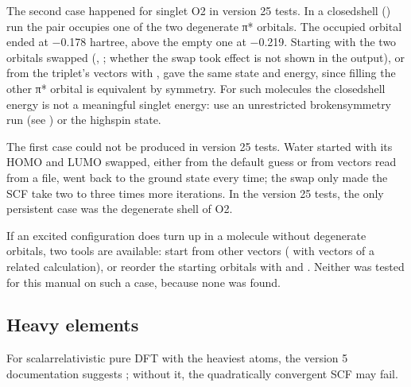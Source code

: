 \documentclass[letterpaper,10pt,english,openany,oneside]{sphinxmanual}
\begin{document}
\sphinxAtStartPar
The second case happened for singlet O2 in version 25 tests. In a closed\sphinxhyphen{}shell () run the pair occupies one
of the two degenerate π* orbitals. The occupied orbital ended at −0.178 hartree, above the empty one at −0.219.
Starting with the two orbitals swapped ({\hyperref[\detokenize{reference/guess:guess-na}]{}}, {\hyperref[\detokenize{reference/guess:guess-nb}]{}}; whether the swap took effect is
not shown in the output), or from the triplet’s vectors with , gave the same state and energy, since filling the other π* orbital is equivalent by symmetry. For such
molecules the closed\sphinxhyphen{}shell energy is not a meaningful singlet energy: use an unrestricted broken\sphinxhyphen{}symmetry run (see
{\hyperref[\detokenize{troubleshooting/common-problems:troubleshooting-open-shell-singlet}]{}}) or the high\sphinxhyphen{}spin state.



\sphinxAtStartPar
The first case could not be produced in version 25 tests. Water started with its HOMO and LUMO swapped, either from
the default guess or from vectors read from a file, went back to the ground state every time; the swap only made
the SCF take two to three times more iterations. In the version 25 tests, the only persistent case was the
degenerate shell of O2.



\sphinxAtStartPar
If an excited configuration does turn up in a molecule without degenerate orbitals, two tools are available: start
from other vectors ( with vectors of a related calculation), or reorder the starting orbitals with
{\hyperref[\detokenize{reference/guess:guess-na}]{}} and {\hyperref[\detokenize{reference/guess:guess-nb}]{}}. Neither was tested for this manual on such a case, because none was
found.




\subsection{Heavy elements}
\label{\detokenize{troubleshooting/common-problems:heavy-elements}}
\sphinxAtStartPar
For scalar\sphinxhyphen{}relativistic pure DFT with the heaviest atoms, the version 5 documentation suggests
{\hyperref[\detokenize{reference/scf:scf-d1small}]{}}; without it, the quadratically convergent SCF may fail.
\end{document}
